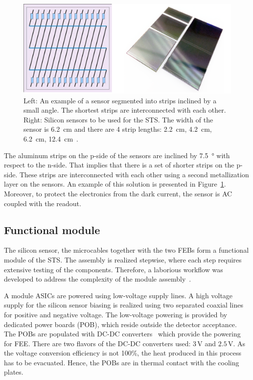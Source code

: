 \begin{figure}[!h]
\centering
\includegraphics[width=0.75\columnwidth]{Chapter2/images/silicon_sensors.png}
\caption{Left: An example of a sensor segmented into strips inclined by a small angle. The shortest strips are interconnected with each other. Right: Silicon sensors to be used for the \gls{STS}. The width of the sensor is \SI{6.2}{\centi\metre} and there are 4 strip lengths: \SI{2.2}{\centi\metre}, \SI{4.2}{\centi\metre}, \SI{6.2}{\centi\metre}, \SI{12.4}{\centi\metre}~\cite{Heuser:54798}.}
\label{fig_sts_si}
\end{figure}

The aluminum strips on the p-side of the sensors are inclined by \SI{7.5}{\degree} with respect to the n-side. That implies that there is a set of shorter strips on the p-side. These strips are interconnected with each other using a second metallization layer on the sensors. An example of this solution is presented in Figure~\ref{fig_sts_si}. Moreover, to protect the electronics from the dark current, the sensor is AC coupled with the readout.
\subsection{Functional module}
\label{sts_module}
The silicon sensor, the microcables together with the two \glspl{FEB} form a functional module of the \gls{STS}. The assembly is realized stepwise, where each step requires extensive testing of the components. Therefore, a laborious workflow was developed to address the complexity of the module assembly~\cite{carmen2}. 

A module \glspl{ASIC} are powered using low-voltage supply lines. A high voltage supply for the silicon sensor biasing is realized using two separated coaxial lines for positive and negative voltage. The low-voltage powering is provided by dedicated power boards (\gls{POB}), which reside outside the detector acceptance. The \glspl{POB} are populated with DC-DC converters~\cite{DC_DC_converter} which provide the powering for \gls{FEE}. There are two flavors of the DC-DC converters used: $3$\,V and $2.5$\,V. As the voltage conversion efficiency is not 100\%, the heat produced in this process has to be evacuated. Hence, the \glspl{POB} are in thermal contact with the cooling plates. 

